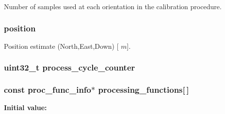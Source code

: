 \-Number of samples used at each orientation in the calibration procedure. 

\hypertarget{group__tables_ga2807b9fb4b79e01dfde022b613d2575f}{
\subsubsection[{position}]{ {\bf position}}}
\label{group__tables_ga2807b9fb4b79e01dfde022b613d2575f}


\-Position estimate (\-North,\-East,\-Down) \mbox{[} $m$\mbox{]}. 

\hypertarget{group__tables_ga69242006691a47df6ea85e8cc45ccc43}{
\subsubsection[{process\-\_\-cycle\-\_\-counter}]{\setlength{\rightskip}{0pt plus 5cm}uint32\-\_\-t {\bf process\-\_\-cycle\-\_\-counter}}}
\label{group__tables_ga69242006691a47df6ea85e8cc45ccc43}
\hypertarget{group__tables_ga41846acfd74bdde84b592227e9875931}{
\subsubsection[{processing\-\_\-functions}]{\setlength{\rightskip}{0pt plus 5cm}const {\bf proc\-\_\-func\-\_\-info}$\ast$ {\bf processing\-\_\-functions}\mbox{[}$\,$\mbox{]}}}
\label{group__tables_ga41846acfd74bdde84b592227e9875931}
{\bfseries \-Initial value\-:}
